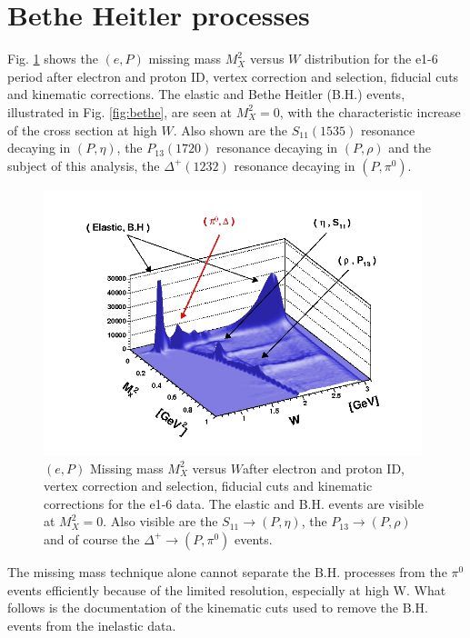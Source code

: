 \section{Bethe Heitler processes}
\label{sec:bethe}

Fig. \ref{fig:wmm_after_fiducial}  shows the $(e,P)$ missing mass $M_X^2$ versus $W$
distribution for the e1-6 period after electron and proton ID, vertex correction
and selection, fiducial cuts and kinematic corrections.
The elastic and Bethe Heitler (B.H.) events, illustrated in Fig. \ref{fig:bethe},	are
 seen at $M_X^2=0$, with the characteristic increase of the cross section
at high $W$. Also shown are the $S_{11}(1535)$ resonance decaying in $(P, \eta)$,
the $P_{13}(1720)$ resonance decaying in $(P, \rho)$ and the subject of this analysis, the
$\Delta^{+}(1232)$ resonance decaying in $(P, \pi^0)$.

\begin{figure}[ht]
\centering
	\includegraphics[width=0.98\textwidth ]{img/wmm_after_fiducial.jpg}
	\caption{$(e,P)$ Missing mass $M_X^2$ versus $W$after electron and proton ID, vertex correction
	and selection, fiducial cuts and kinematic corrections for the e1-6 data.
	The elastic and B.H. events are visible at $M_X^2=0$. Also visible are the $S_{11}\rightarrow (P, \eta)$,
	the $P_{13}\rightarrow (P, \rho)$ and of course the $\Delta^{+}\rightarrow (P, \pi^0)$ events. }
		\label{fig:wmm_after_fiducial}
\end{figure}

\vspace{1cm}

The missing mass technique alone cannot separate the B.H. processes from the
$\pi^0$ events efficiently because of the limited resolution, especially at high W.
What follows is the documentation of the kinematic cuts used to remove the B.H. events from
the inelastic data.

